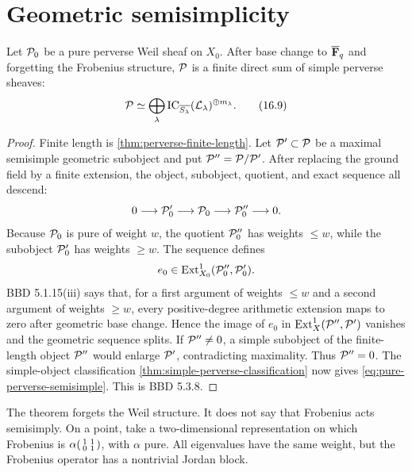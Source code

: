 \section{Geometric semisimplicity}

\begin{theorem}
\label{thm:pure-perverse-geometric-semisimple}
Let \(\mathcal P_0\) be a pure perverse Weil sheaf on \(X_0\).  After base change to
\(\overline{\mathbf F}_q\) and forgetting the Frobenius structure, \(\mathcal P\) is a finite direct
sum of simple perverse sheaves:
\[
  \mathcal P\simeq
  \bigoplus_\lambda
  \operatorname{IC}_{\overline{S_\lambda}}(\mathcal L_\lambda)^{\oplus m_\lambda}.
\tag{16.9}\label{eq:pure-perverse-semisimple}
\]
\end{theorem}

\begin{proof}
Finite length is \cref{thm:perverse-finite-length}.  Let \(\mathcal P'\subset\mathcal P\)
be a maximal semisimple geometric subobject and put
\(\mathcal P''=\mathcal P/\mathcal P'\).  After replacing the ground field by a finite extension,
the object, subobject, quotient, and exact sequence all descend:
\[
 0\longrightarrow\mathcal P'_0\longrightarrow\mathcal P_0
 \longrightarrow\mathcal P''_0\longrightarrow0.
\]
Because \(\mathcal P_0\) is pure of weight \(w\), the quotient \(\mathcal P''_0\) has
weights \(\leq w\), while the subobject \(\mathcal P'_0\) has weights \(\geq w\).
The sequence defines
\[
 e_0\in\operatorname{Ext}^1_{X_0}(\mathcal P''_0,\mathcal P'_0).
\]
BBD 5.1.15(iii) says that, for a first argument of weights \(\leq w\) and a
second argument of weights \(\geq w\), every positive-degree arithmetic
extension maps to zero after geometric base change.  Hence the image of
\(e_0\) in \(\operatorname{Ext}^1_X(\mathcal P'',\mathcal P')\) vanishes and the geometric sequence
splits.  If \(\mathcal P''\neq0\), a simple subobject of the finite-length object
\(\mathcal P''\) would enlarge \(\mathcal P'\), contradicting maximality.  Thus
\(\mathcal P''=0\).  The simple-object classification
\cref{thm:simple-perverse-classification} now gives
\eqref{eq:pure-perverse-semisimple}.  This is BBD 5.3.8.
\end{proof}

\begin{warning}
\label{warn:frobenius-not-semisimple}
The theorem forgets the Weil structure.  It does not say that Frobenius acts
semisimply.  On a point, take a two-dimensional representation on which
Frobenius is \(\alpha\begin{psmallmatrix}1&1\\0&1\end{psmallmatrix}\), with
\(\alpha\) pure.  All eigenvalues have the same weight, but the Frobenius
operator has a nontrivial Jordan block.
\end{warning}

